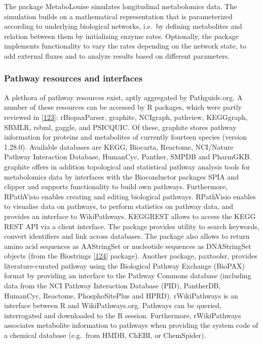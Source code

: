 \documentclass[]{article}
\begin{document}
The package MetaboLouise simulates longitudinal metabolomics data. The simulation builds on a mathematical representation that is parameterized according to underlying biological networks, i.e.~by defining metabolites and relation between them by initializing enzyme rates. Optionally, the package implements functionality to vary the rates depending on the network state, to add external fluxes and to analyze results based on different parameters.

\hypertarget{pathway-resources-and-interfaces}{%
\subsubsection{Pathway resources and interfaces}\label{pathway-resources-and-interfaces}}

A plethora of pathway resources exist, aptly aggregated by Pathguide.org. A number of these resources can be accessed by R packages, which were partly reviewed in {[}\protect\hyperlink{ref-kramer_2014}{123}{]}: rBiopaxParser, graphite, NCIgraph, pathview, KEGGgraph, SBMLR, rsbml, gaggle, and PSICQUIC. Of these, graphite stores pathway information for proteins and metabolites of currently fourteen species (version 1.28.0). Available databases are KEGG, Biocarta, Reactome, NCI/Nature Pathway Interaction Database, HumanCyc, Panther, SMPDB and PharmGKB. graphite offers in addition topological and statistical pathway analysis tools for metabolomics data by interfaces with the Bioconductor packages SPIA and clipper and supports functionality to build own pathways. Furthermore, RPathVisio enables creating and editing biological pathways. RPathVisio enables to visualise data on pathways, to perform statistics on pathway data, and provides an interface to WikiPathways. KEGGREST allows to access the KEGG REST API via a client interface. The package provides utility to search keywords, convert identifiers and link across databases. The package also allows to return amino acid sequences as AAStringSet or nucleotide sequences as DNAStringSet objects (from the Biostrings {[}\protect\hyperlink{ref-tenenbaum_website_2019}{124}{]} package).
Another package, paxtoolsr, provides literature-curated pathway using the Biological Pathway Exchange (BioPAX) format by providing an interface to the Pathway Commons database (including data from the NCI Pathway Interaction Database (PID), PantherDB, HumanCyc, Reactome, PhosphoSitePlus and HPRD). rWikiPathways is an interface between R and WikiPathways.org. Pathways can be queried, interrogated and downloaded to the R session. Furthermore, rWikiPathways associates metabolite information to pathways when providing the system code of a chemical database (e.g.~from HMDB, ChEBI, or ChemSpider).
\end{document}
